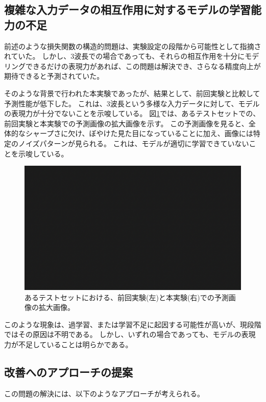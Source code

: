     \subsection{複雑な入力データの相互作用に対するモデルの学習能力の不足}
    前述のような損失関数の構造的問題は、実験設定の段階から可能性として指摘されていた。
    しかし、3波長での場合であっても、それらの相互作用を十分にモデリングできるだけの表現力があれば、この問題は解決でき、さらなる精度向上が期待できると予測されていた。

    そのような背景で行われた本実験であったが、結果として、前回実験と比較して予測性能が低下した。
    これは、3波長という多様な入力データに対して、モデルの表現力が十分でないことを示唆している。
    図\ref{fig:exp2_pd_discuss_1}では、あるテストセットでの、前回実験と本実験での予測画像の拡大画像を示す。
    この予測画像を見ると、全体的なシャープさに欠け、ぼやけた見た目になっていることに加え、画像には特定のノイズパターンが見られる。
    これは、モデルが適切に学習できていないことを示唆している。
    \begin{figure}[htbp]
      \centering
      \includegraphics[width=\textwidth]{figures/sample.png}
      \caption{あるテストセットにおける、前回実験(左)と本実験(右)での予測画像の拡大画像。}
      \label{fig:exp2_pd_discuss_1}
    \end{figure}
    このような現象は、過学習、または学習不足に起因する可能性が高いが、現段階ではその原因は不明である。
    しかし、いずれの場合であっても、モデルの表現力が不足していることは明らかである。
    
    \subsection{改善へのアプローチの提案}
      この問題の解決には、以下のようなアプローチが考えられる。
